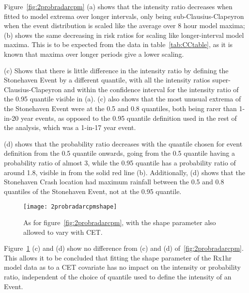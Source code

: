 Figure~\ref{fig:2probradarcpm} (a) shows that the intensity ratio decreases when fitted to model extrema over longer intervals,
    only being sub-Clausius-Clapeyron when the event distribution is scaled like the average over 8 hour model maxima;
(b) shows the same decreasing in risk ratios for scaling like longer-interval model maxima.
This is to be expected from the data in table~\ref{tab:CCtable},
    as it is known that maxima over longer periods give a lower scaling.

(c) Shows that there is little difference in the intensity ratio by defining the Stonehaven Event by a different
    quantile, with all the intensity ratios super-Clausius-Clapeyron and within the confidence interval
    for the intensity ratio of the 0.95 quantile visible in (a).
(c) also shows that the most unusual extrema of the Stonehaven Event were at the 0.5 and 0.8 quantiles,
    both being rarer than 1-in-20 year events, as opposed to the 0.95 quantile definition used in the
    rest of the analysis, which was a 1-in-17 year event.

(d) shows that the probability ratio decreases with the quantile chosen for event definition from the 0.5 quantile onwards,
    going from the 0.5 quantile having a probability ratio of almost 3,
    while the 0.95 quantile has a probability ratio of around 1.8, visible in from the solid red line (b).
Additionally, (d) shows that the Stonehaven Crash location had maximum rainfall between the 0.5 and 0.8 quantiles of the Stonehaven Event,
    not at the 0.95 quantile.

\begin{figure}[H]
    \centering
    \texttt{[image: 2probradarcpmshape]}
    \caption{As for figure~\ref{fig:2probradarcpm},
    with the shape parameter also allowed to vary with CET.}
    \label{fig:2probradarcpmshape}
\end{figure}

Figure~\ref{fig:2probradarcpmshape} (c) and (d) show no difference from (c) and (d) of~\ref{fig:2probradarcpm}.
This allows it to be concluded that fitting the shape parameter of the Rx1hr model data as to a CET covariate has
    no impact on the intensity or probability ratio,
    independent of the choice of quantile used to define the intensity of an Event.

